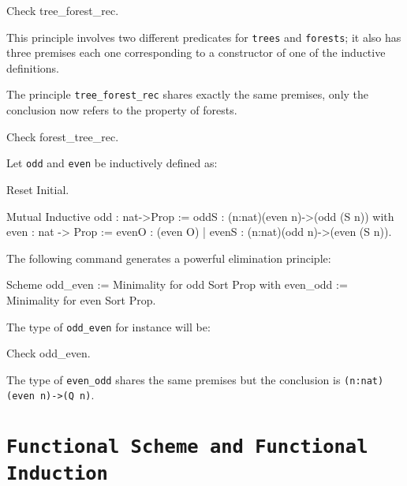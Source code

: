 \begin{coq_example*}
\begin{coq_example}
Check tree_forest_rec.
\end{coq_example}

This principle involves two different predicates for {\tt trees} and
{\tt forests}; it also has three premises each one corresponding to a
constructor of one of the inductive definitions.

The principle {\tt tree\_forest\_rec} shares exactly the same
premises, only the conclusion now refers to the property of forests.

\begin{coq_example}
Check forest_tree_rec.
\end{coq_example}


Let {\tt odd} and {\tt even} be inductively defined as:

\begin{coq_eval}
Reset Initial.
\end{coq_eval}

\begin{coq_example*}
Mutual Inductive odd : nat->Prop := 
    oddS : (n:nat)(even n)->(odd (S n))
with even : nat -> Prop := 
    evenO : (even O) 
  | evenS : (n:nat)(odd n)->(even (S n)).  
\end{coq_example*}

The following command generates a powerful elimination
principle:

\begin{coq_example*}
Scheme odd_even := Minimality for odd Sort Prop
with   even_odd := Minimality for even Sort Prop.
\end{coq_example*}

The type of {\tt odd\_even} for instance will be:

\begin{coq_example}
Check odd_even.
\end{coq_example}

The type of {\tt even\_odd} shares the same premises but the
conclusion is {\tt (n:nat)(even n)->(Q n)}.

\section{{\tt Functional Scheme and Functional Induction}}
\label{FunScheme-examples}

\firstexample
{}


\end{coq_example*}

